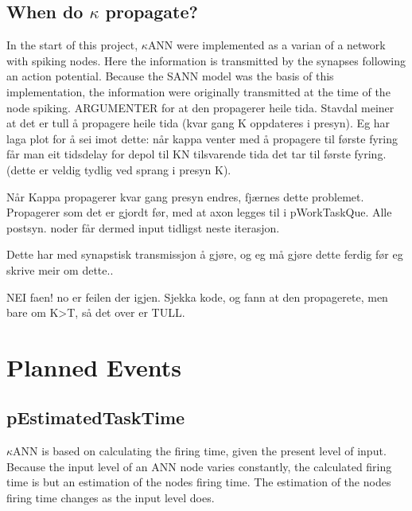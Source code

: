 	\subsection{When do $\kappa$ propagate?}
	In the start of this project, $\kappa$ANN were implemented as a varian of a network with spiking nodes.
	Here the information is transmitted by the synapses following an action potential. 
	Because the SANN model was the basis of this implementation, the information were originally transmitted at the time of the node spiking.
	ARGUMENTER for at den propagerer heile tida.
Stavdal meiner at det er tull å propagere heile tida (kvar gang K oppdateres i presyn). 
Eg har laga plot for å sei imot dette: når kappa venter med å propagere til første fyring får man eit tidsdelay for depol til KN tilsvarende tida det tar til første fyring. (dette er veldig tydlig ved sprang i presyn K).

Når Kappa propagerer kvar gang presyn endres, fjærnes dette problemet. Propagerer som det er gjordt før, med at axon legges til i pWorkTaskQue. Alle postsyn. noder får dermed input tidligst neste iterasjon.

Dette har med synapstisk transmissjon å gjøre, og eg må gjøre dette ferdig før eg skrive meir om dette..

NEI faen! no er feilen der igjen. Sjekka kode, og fann at den propagerete, men bare om K>T, så det over er TULL.
















	\section{Planned Events}
	\label{secPlannedEvents}
	\subsection{pEstimatedTaskTime}
	$\kappa$ANN is based on calculating the firing time, given the present level of input. 
	Because the input level of an ANN node varies constantly, the calculated firing time is but an estimation of the nodes firing time. 
	The estimation of the nodes firing time changes as the input level does.
	
